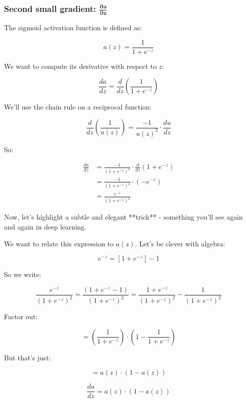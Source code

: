 \documentclass[11pt]{article}
\begin{document}
\subsubsection*{Second small gradient: $\boldsymbol{\frac{\partial a}{\partial z}}$}

The sigmoid activation function is defined as:

\[
a(z) = \frac{1}{1 + e^{-z}}
\]

We want to compute its derivative with respect to $z$:

\[
\frac{da}{dz} = \frac{d}{dz} \left( \frac{1}{1 + e^{-z}} \right)
\]

We'll use the chain rule on a reciprocal function:

\begin{tcolorbox}[colback=gray!5, colframe=gray!50!black]
\[
\frac{d}{dz} \left( \frac{1}{u(z)} \right) = \frac{-1}{u(z)^2} \cdot \frac{du}{dz}
\]
\end{tcolorbox}

So:

\[
\begin{aligned}
\frac{da}{dz} 
&= \frac{-1}{(1 + e^{-z})^2} \cdot \frac{d}{dz}(1 + e^{-z}) \\
&= \frac{-1}{(1 + e^{-z})^2} \cdot (-e^{-z}) \\
&= \frac{e^{-z}}{(1 + e^{-z})^2}
\end{aligned}
\]

\vspace{1em}

Now, let's highlight a subtle and elegant **trick** - something you'll see again and again in deep learning.

We want to relate this expression to \( a(z) \). Let's be clever with algebra:

\[
e^{-z} = \left[ 1 + e^{-z} \right] - 1
\]

So we write:

\[
\frac{e^{-z}}{(1 + e^{-z})^2}
= \frac{ \left( 1 + e^{-z} - 1 \right)}{(1 + e^{-z})^2}
= \frac{1 + e^{-z}}{(1 + e^{-z})^2} - \frac{1}{(1 + e^{-z})^2}
\]

Factor out:

\[
= \left( \frac{1}{1 + e^{-z}} \right) \cdot \left( 1 - \frac{1}{1 + e^{-z}} \right)
\]

But that's just:

\[
= a(z) \cdot (1 - a(z))
\]

\begin{tcolorbox}[colback=gray!3, colframe=gray!30!black]
\[
\boxed{ \frac{da}{dz} = a(z) \cdot (1 - a(z)) }
\]
\end{tcolorbox}
\end{document}
